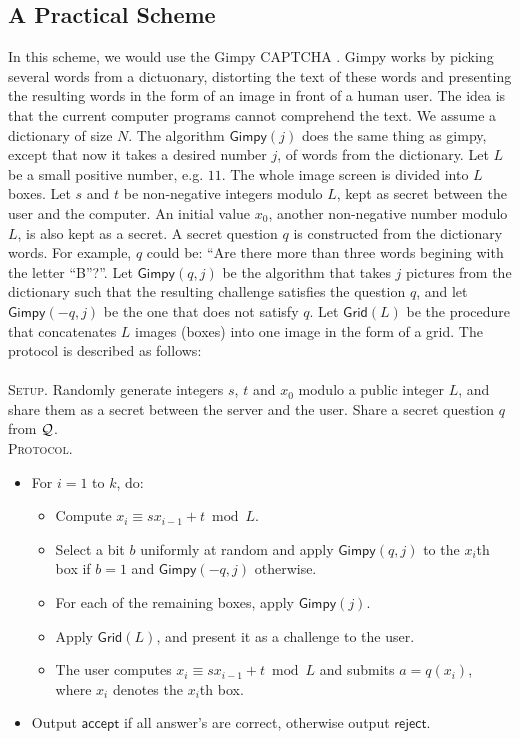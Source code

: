\documentclass{llncs}
\begin{document}
\subsection{A Practical Scheme}
In this scheme, we would use the Gimpy CAPTCHA \cite{gimpy}. Gimpy works by picking several words from a dictuonary, distorting the text of these words and presenting the resulting words in the form of an image in front of a human user. The idea is that the current computer programs cannot comprehend the text. We assume a dictionary of size $N$. The algorithm $\mathsf{Gimpy}\left( j \right)$ does the same thing as gimpy, except that now it takes a desired number $j$, of words from the dictionary. Let $L$ be a small positive number, e.g. $11$. The whole image screen is divided into $L$ boxes. Let $s$ and $t$ be non-negative integers modulo $L$, kept as secret between the user and the computer. An initial value $x_0$, another non-negative number modulo $L$, is also kept as a secret. A secret question $q$ is constructed from the dictionary words. For example, $q$ could be: ``Are there more than three words begining with the letter ``B''?''. Let $\mathsf{Gimpy}\left( q, j \right)$  be the algorithm that takes $j$ pictures from the dictionary such that the resulting challenge satisfies the question $q$, and let $\mathsf{Gimpy}\left( -q, j \right)$ be the one that does not satisfy $q$. Let $\mathsf{Grid}\left( L \right)$ be the procedure that concatenates $L$ images (boxes) into one image in the form of a grid. The protocol is described as follows:\\\\
\textsc{Setup.} Randomly generate integers $s$, $t$ and $x_0$ modulo a public integer $L$, and share them as a secret between the server and the user. Share a secret question $q$ from ${\cal Q}$.\\
\textsc{Protocol.}
\begin{itemize}
\item For $i = 1$ to $k$, do:
	\begin{itemize}
	\item Compute $x_i  \equiv sx_{i - 1}  + t\bmod L$.
	\item Select a bit $b$ uniformly at random and apply $\mathsf{Gimpy}\left( q, j \right)$ to the $x_i$th box if $b=1$ and $\mathsf{Gimpy}\left( -q, j \right)$ otherwise. 
	\item For each of the remaining boxes, apply $\mathsf{Gimpy}\left( j \right)$. 
	\item Apply $\mathsf{Grid}\left( L \right)$, and present it as a challenge to the user.
	\item The user computes $x_i  \equiv sx_{i - 1}  + t\bmod L$ and submits $a = q\left( x_i \right)$, where $x_i$ denotes the $x_i$th box.
	\end{itemize}
\item Output $\mathsf{accept}$ if all answer's are correct, otherwise output $\mathsf{reject}$.
\end{itemize}
\end{document}
